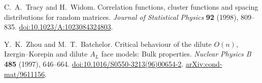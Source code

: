 C.~A.~Tracy and H.~Widom.
Correlation functions, cluster functions and spacing distributions for random matrices.
\emph{Journal of Statistical Physics} \textbf{92} (1998), 809--835.
\href{https://doi.org/10.1023/A:1023084324803}{doi:10.1023/A:1023084324803}.

Y.~K.~Zhou and M.~T.~Batchelor.
Critical behaviour of the dilute $O(n)$, Izergin--Korepin and dilute
$A_L$ face models: Bulk properties.
\emph{Nuclear Physics B} \textbf{485} (1997), 646--664.
\href{https://doi.org/10.1016/S0550-3213(96)00654-2}{doi:10.1016/S0550-3213(96)00654-2}.
\href{https://arxiv.org/abs/cond-mat/9611156}{arXiv:cond-mat/9611156}.
